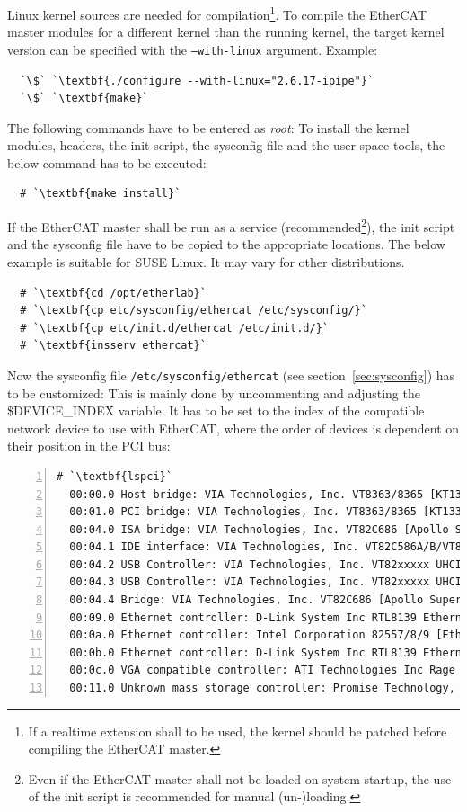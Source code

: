\documentclass[a4paper,12pt,BCOR6mm,bibtotoc,idxtotoc]{scrbook}
\begin{document}
Linux kernel sources are needed for compilation\footnote{If a realtime
  extension shall to be used, the kernel should be patched before
  compiling the EtherCAT master.}. To compile the EtherCAT master
modules for a different kernel than the running kernel, the target
kernel version can be specified with the \texttt{--with-linux}
argument. Example:

\begin{lstlisting}
  `\$` `\textbf{./configure --with-linux="2.6.17-ipipe"}`
  `\$` `\textbf{make}`
\end{lstlisting}

The following commands have to be entered as \textit{root}: To install
the kernel modules, headers, the init script, the sysconfig file and
the user space tools, the below command has to be executed:

\begin{lstlisting}
  # `\textbf{make install}`
\end{lstlisting}

If the EtherCAT master shall be run as a service
(recommended\footnote{Even if the EtherCAT master shall not be loaded
  on system startup, the use of the init script is recommended for
  manual (un-)loading.}), the init script and the sysconfig file have
to be copied to the appropriate locations. The below example is
suitable for SUSE Linux.  It may vary for other distributions.

\begin{lstlisting}
  # `\textbf{cd /opt/etherlab}`
  # `\textbf{cp etc/sysconfig/ethercat /etc/sysconfig/}`
  # `\textbf{cp etc/init.d/ethercat /etc/init.d/}`
  # `\textbf{insserv ethercat}`
\end{lstlisting}

Now the sysconfig file \texttt{/etc/sysconfig/ethercat} (see
section~\ref{sec:sysconfig}) has to be customized: This is mainly done
by uncommenting and adjusting the \$DEVICE\_INDEX variable. It has to
be set to the index of the compatible network device to use with
EtherCAT, where the order of devices is dependent on their position in
the PCI bus:

\begin{lstlisting}[numbers=left,basicstyle=\ttfamily\scriptsize]
  # `\textbf{lspci}`
  00:00.0 Host bridge: VIA Technologies, Inc. VT8363/8365 [KT133/KM133] (rev 03)
  00:01.0 PCI bridge: VIA Technologies, Inc. VT8363/8365 [KT133/KM133 AGP]
  00:04.0 ISA bridge: VIA Technologies, Inc. VT82C686 [Apollo Super South] (rev 40)
  00:04.1 IDE interface: VIA Technologies, Inc. VT82C586A/B/VT82C686/A/B/VT823x/A/C...
  00:04.2 USB Controller: VIA Technologies, Inc. VT82xxxxx UHCI USB 1.1 Controller...
  00:04.3 USB Controller: VIA Technologies, Inc. VT82xxxxx UHCI USB 1.1 Controller...
  00:04.4 Bridge: VIA Technologies, Inc. VT82C686 [Apollo Super ACPI] (rev 40)
  00:09.0 Ethernet controller: D-Link System Inc RTL8139 Ethernet (rev 10)
  00:0a.0 Ethernet controller: Intel Corporation 82557/8/9 [Ethernet Pro 100] (rev 08)
  00:0b.0 Ethernet controller: D-Link System Inc RTL8139 Ethernet (rev 10)
  00:0c.0 VGA compatible controller: ATI Technologies Inc Rage XL (rev 27)
  00:11.0 Unknown mass storage controller: Promise Technology, Inc. PDC20265...
\end{lstlisting}
\end{document}
